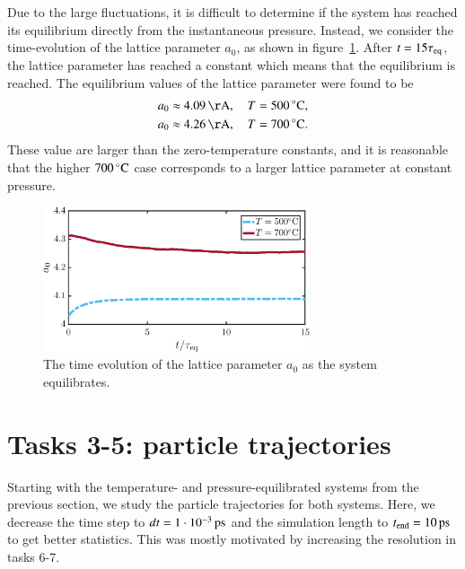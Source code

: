 Due to the large fluctuations, it is difficult to determine if the system has reached its equilibrium directly from the instantaneous pressure. Instead, we consider the time-evolution of the lattice parameter $a_0$, as shown in figure~\ref{fig:a0}. After $t = 15 \tau_{\rm eq}$, the lattice parameter has reached a constant which means that the equilibrium is reached. The equilibrium values of the lattice parameter were found to be 
\begin{align}
a_0 &\approx \unit[4.09]{\AA}, \quad T=\unit[500]{^\circ C}, \\
a_0 &\approx \unit[4.26]{\AA}, \quad T=\unit[700]{^\circ C} .
\end{align} 
These value are larger than the zero-temperature constants, and it is reasonable that the higher $\unit[700]{^\circ C}$ case corresponds to a larger lattice parameter at constant pressure. 
\begin{figure}[!ht]
\begin{center}
  \includegraphics[width=0.7\textwidth]{../figures/a0}  
  \caption{The time evolution of the lattice parameter $a_0$ as the system equilibrates.}
  \label{fig:a0}
\end{center}
\end{figure}



\section*{Tasks 3-5: particle trajectories}
Starting with the temperature- and pressure-equilibrated systems from the previous section, we study the particle trajectories for both systems. Here, we decrease the time step to   $dt       = \unit[1\cdot 10^{-3}]{ps}$ and the simulation length to $t_{\rm end} = \unit[10]{ps}$ to get better statistics. This was mostly motivated by increasing the resolution in tasks 6-7. 

